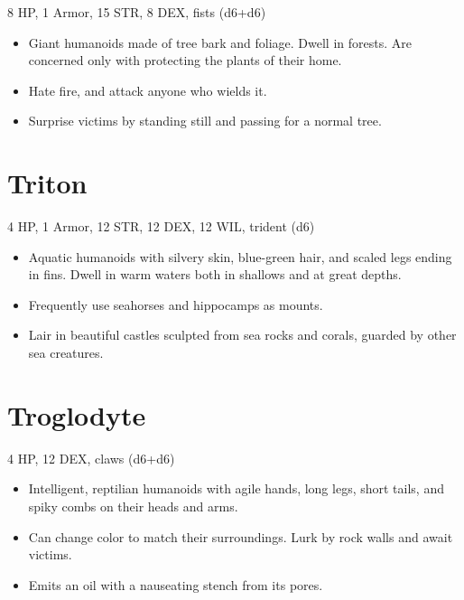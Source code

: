 \documentclass[
  10pt,
  american,
]{article}
\begin{document}
8 HP, 1 Armor, 15 STR, 8 DEX, fists (d6+d6)

\begin{samepage}
\begin{itemize}
\setlength\itemsep{-.5em}
\item Giant humanoids made of tree bark and foliage. Dwell in forests. Are concerned only with protecting the plants of their home.
\item Hate fire, and attack anyone who wields it.
\item Surprise victims by standing still and passing for a normal tree.
\end{itemize}
\end{samepage}

\hypertarget{triton}{%
\section{Triton}\label{triton}}

4 HP, 1 Armor, 12 STR, 12 DEX, 12 WIL, trident (d6)

\begin{samepage}
\begin{itemize}
\setlength\itemsep{-.5em}
\item Aquatic humanoids with silvery skin, blue-green hair, and scaled legs ending in fins. Dwell in warm waters both in shallows and at great depths.
\item Frequently use seahorses and hippocamps as mounts.
\item Lair in beautiful castles sculpted from sea rocks and corals, guarded by other sea creatures.
\end{itemize}
\end{samepage}

\hypertarget{troglodyte}{%
\section{Troglodyte}\label{troglodyte}}

4 HP, 12 DEX, claws (d6+d6)

\begin{samepage}
\begin{itemize}
\setlength\itemsep{-.5em}
\item Intelligent, reptilian humanoids with agile hands, long legs, short tails, and spiky combs on their heads and arms.
\item Can change color to match their surroundings. Lurk by rock walls and await victims.
\item Emits an oil with a nauseating stench from its pores.
\end{itemize}
\end{samepage}
\end{document}
